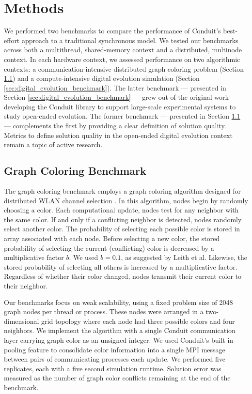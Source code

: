 \section{Methods}

We performed two benchmarks to compare the performance of Conduit's best-effort approach to a traditional synchronous model.
We tested our benchmarks across both a multithread, shared-memory context and a distributed, multinode context.
In each hardware context, we assessed performance on two algorithmic contexts: a communication-intensive distributed graph coloring problem (Section \ref{sec:graph_coloring_benchmark}) and a compute-intensive digital evolution simulation (Section \ref{sec:digital_evolution_benchmark}).
The latter benchmark --- presented in Section \ref{sec:digital_evolution_benchmark} --- grew out of the original work developing the Conduit library to support large-scale experimental systems to study open-ended evolution.
The former benchmark --- presented in Section \ref{sec:graph_coloring_benchmark} --- complements the first by providing a clear definition of solution quality.
Metrics to define solution quality in the open-ended digital evolution context remain a topic of active research.

\subsection{ Graph Coloring Benchmark } \label{sec:graph_coloring_benchmark}

The graph coloring benchmark employs a graph coloring algorithm designed for distributed WLAN channel selection \cite{leith2012wlan}.
In this algorithm, nodes begin by randomly choosing a color.
Each computational update, nodes test for any neighbor with the same color.
If and only if a conflicting neighbor is detected, nodes randomly select another color.
The probability of selecting each possible color is stored in array associated with each node.
Before selecting a new color, the stored probability of selecting the current (conflicting) color is decreased by a multiplicative factor $b$.
We used $b=0.1$, as suggested by Leith et al.
Likewise, the stored probability of selecting all others is increased by a multiplicative factor.
Regardless of whether their color changed, nodes transmit their current color to their neighbor.

Our benchmarks focus on weak scalability, using a fixed problem size of 2048 graph nodes per thread or process.
These nodes were arranged in a two-dimensional grid topology where each node had three possible colors and four neighbors.
We implement the algorithm with a single Conduit communication layer carrying graph color as an unsigned integer.
We used Conduit's built-in pooling feature to consolidate color information into a single MPI message between pairs of communicating processes each update.
We performed five replicates, each with a five second simulation runtime.
Solution error was measured as the number of graph color conflicts remaining at the end of the benchmark.

